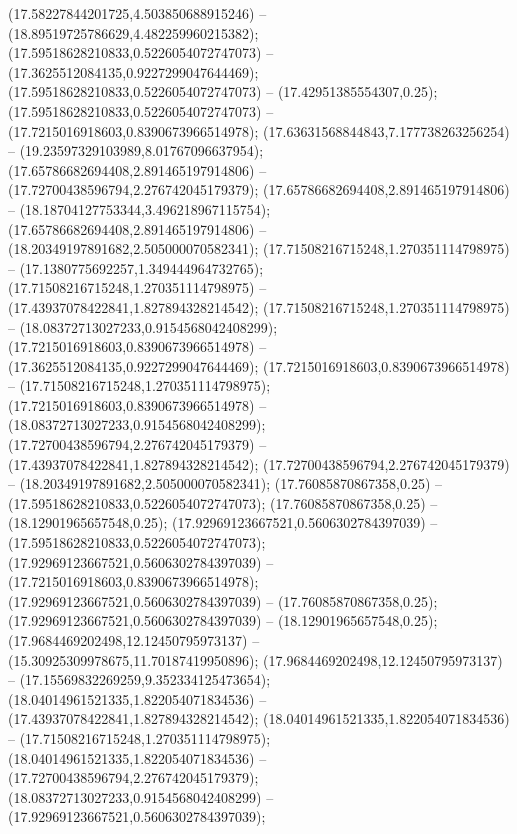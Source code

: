  (17.58227844201725,4.503850688915246) -- (18.89519725786629,4.482259960215382);
 (17.59518628210833,0.5226054072747073) -- (17.3625512084135,0.9227299047644469);
 (17.59518628210833,0.5226054072747073) -- (17.42951385554307,0.25);
 (17.59518628210833,0.5226054072747073) -- (17.7215016918603,0.8390673966514978);
 (17.63631568844843,7.177738263256254) -- (19.23597329103989,8.01767096637954);
 (17.65786682694408,2.891465197914806) -- (17.72700438596794,2.276742045179379);
 (17.65786682694408,2.891465197914806) -- (18.18704127753344,3.496218967115754);
 (17.65786682694408,2.891465197914806) -- (18.20349197891682,2.505000070582341);
 (17.71508216715248,1.270351114798975) -- (17.1380775692257,1.349444964732765);
 (17.71508216715248,1.270351114798975) -- (17.43937078422841,1.827894328214542);
 (17.71508216715248,1.270351114798975) -- (18.08372713027233,0.9154568042408299);
 (17.7215016918603,0.8390673966514978) -- (17.3625512084135,0.9227299047644469);
 (17.7215016918603,0.8390673966514978) -- (17.71508216715248,1.270351114798975);
 (17.7215016918603,0.8390673966514978) -- (18.08372713027233,0.9154568042408299);
 (17.72700438596794,2.276742045179379) -- (17.43937078422841,1.827894328214542);
 (17.72700438596794,2.276742045179379) -- (18.20349197891682,2.505000070582341);
 (17.76085870867358,0.25) -- (17.59518628210833,0.5226054072747073);
 (17.76085870867358,0.25) -- (18.12901965657548,0.25);
 (17.92969123667521,0.5606302784397039) -- (17.59518628210833,0.5226054072747073);
 (17.92969123667521,0.5606302784397039) -- (17.7215016918603,0.8390673966514978);
 (17.92969123667521,0.5606302784397039) -- (17.76085870867358,0.25);
 (17.92969123667521,0.5606302784397039) -- (18.12901965657548,0.25);
 (17.9684469202498,12.12450795973137) -- (15.30925309978675,11.70187419950896);
 (17.9684469202498,12.12450795973137) -- (17.15569832269259,9.352334125473654);
 (18.04014961521335,1.822054071834536) -- (17.43937078422841,1.827894328214542);
 (18.04014961521335,1.822054071834536) -- (17.71508216715248,1.270351114798975);
 (18.04014961521335,1.822054071834536) -- (17.72700438596794,2.276742045179379);
 (18.08372713027233,0.9154568042408299) -- (17.92969123667521,0.5606302784397039);
